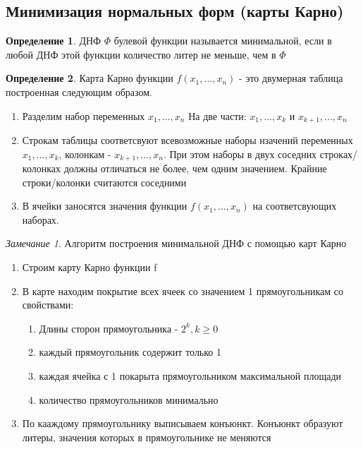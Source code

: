 \documentclass[a4paper]{article}
\theoremstyle{definition}
\newtheorem*{definition}{Определение}
\theoremstyle{remark}
\newtheorem*{remark}{Замечание}
\begin{document}
    \subsection{Минимизация нормальных форм (карты Карно)}
	\begin{definition}
		ДНФ $\Phi$ булевой функции называется минимальной, если в любой ДНФ этой функции количество литер не меньше, чем в $\Phi$
	\end{definition}
	\begin{definition}
		Карта Карно функции $f(x_1, ..., x_n)$ - это двумерная таблица построенная следующим образом.
		\begin{enumerate}
			\item Разделим набор переменных $x_1, ..., x_n$ На две части: $x_1, ..., x_k$ и $x_{k+1}, ..., x_n$
			\item Строкам таблицы соответсвуют всевозможные наборы нзачений переменных $x_1, ..., x_k$, колонкам - $x_{k+1}, ..., x_n$. При этом наборы в двух соседних строках/колонках должны отличаться не более, чем одним значением. Крайние строки/колонки считаются соседними
			\item В ячейки заносятся значения функции $f(x_1, ..., x_n)$ на соответсвующих наборах.
		\end{enumerate}
	\end{definition}
	\begin{remark}
		Алгоритм построения минимальной ДНФ с помощью карт Карно
		\begin{enumerate}
			\item Строим карту Карно функции f
			\item В карте находим покрытие всех ячеек со значением 1 прямоугольникам со свойствами:
			\begin{enumerate}
				\item Длины сторон прямоугольника - $2^k, k \geq 0$
				\item каждый прямоугольник содержит только 1
				\item каждая ячейка с 1 покарыта прямоугольником максимальной площади
				\item количество прямоугольников минимально
			\end{enumerate}
			\item По кааждому прямоугольнику выписываем конъюнкт. Конъюнкт образуют литеры, значения которых в прямоугольнике не меняются
		\end{enumerate}
	\end{remark}
\end{document}
